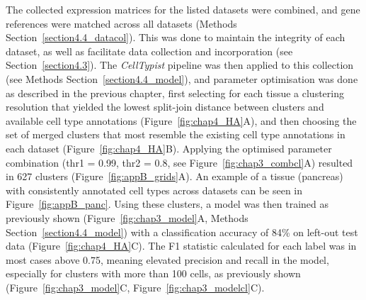 The collected expression matrices for the listed datasets were combined, and gene references were matched across all datasets (Methods Section~\ref{section4.4_datacol}). This was done to maintain the integrity of each dataset, as well as facilitate data collection and incorporation (see Section~\ref{section4.3}). The \textit{CellTypist} pipeline was then applied to this collection (see Methods Section~\ref{section4.4_model}), and parameter optimisation was done as described in the previous chapter, first selecting for each tissue a clustering resolution that yielded the lowest split-join distance between clusters and available cell type annotations (Figure~\ref{fig:chap4_HA}A), and then choosing the set of merged clusters that most resemble the existing cell type annotations in each dataset (Figure~\ref{fig:chap4_HA}B). Applying the optimised parameter combination (thr1 = 0.99, thr2 = 0.8, see Figure~\ref{fig:chap3_combcl}A) resulted in 627 clusters (Figure~\ref{fig:appB_grids}A). An example of a tissue (pancreas) with consistently annotated cell types across datasets can be seen in Figure~\ref{fig:appB_panc}. Using these clusters, a model was then trained as previously shown (Figure~\ref{fig:chap3_model}A, Methods Section~\ref{section4.4_model}) with a classification accuracy of 84\% on left-out test data (Figure~\ref{fig:chap4_HA}C). The F1 statistic calculated for each label was in most cases above 0.75, meaning elevated precision and recall in the model, especially for clusters with more than 100 cells, as previously shown (Figure~\ref{fig:chap3_model}C, Figure~\ref{fig:chap3_modelcl}C).

